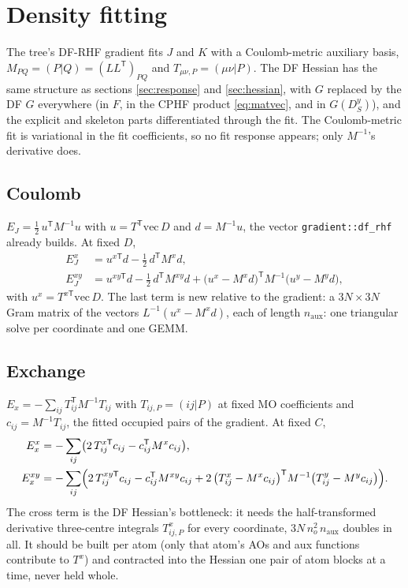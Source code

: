 \documentclass[11pt]{article}
\newcommand{\code}[1]{\texttt{#1}}
\newcommand{\Dsk}[1]{D_S^{#1}}
\begin{document}
\section{Density fitting}
\label{sec:rhf-df}

The tree's DF-RHF gradient fits $J$ and $K$ with a Coulomb-metric auxiliary
basis, $M_{PQ} = (P|Q) = (LL^{\mathsf T})_{PQ}$ and $T_{\mu\nu,P} =
(\mu\nu|P)$. The DF Hessian has the same structure as sections
\ref{sec:response} and \ref{sec:hessian}, with $G$ replaced by the DF $G$
everywhere (in $F$, in the CPHF product \eqref{eq:matvec}, and in
$G(\Dsk{y})$), and the explicit and skeleton parts differentiated through
the fit. The Coulomb-metric fit is variational in the fit coefficients, so
no fit response appears; only $M^{-1}$'s derivative does.

\subsection{Coulomb}

$E_J = \frac12\,u^{\mathsf T} M^{-1} u$ with $u = T^{\mathsf T}\mathrm{vec}\,D$
and $d = M^{-1}u$, the vector \code{gradient::df\_rhf} already builds. At
fixed $D$,
\begin{align}
  E_J^x &= u^{x\mathsf T} d - \tfrac12\,d^{\mathsf T} M^x d,\\
  E_J^{xy} &= u^{xy\mathsf T} d - \tfrac12\,d^{\mathsf T} M^{xy} d
  + \bigl(u^x - M^x d\bigr)^{\mathsf T} M^{-1} \bigl(u^y - M^y d\bigr),
  \label{eq:dfj}
\end{align}
with $u^x = T^{x\mathsf T}\mathrm{vec}\,D$. The last term is new
relative to the gradient: a $3N\times3N$ Gram matrix of the vectors
$L^{-1}(u^x - M^x d)$, each of length $n_{\mathrm{aux}}$: one triangular
solve per coordinate and one GEMM.

\subsection{Exchange}

$E_x = -\sum_{ij} T_{ij}^{\mathsf T} M^{-1} T_{ij}$ with $T_{ij,P} = (ij|P)$
at fixed MO coefficients and $c_{ij} = M^{-1}T_{ij}$, the fitted occupied
pairs of the gradient. At fixed $C$,
\begin{align}
  E_x^x &= -\sum_{ij}\bigl(2\,T^{x\mathsf T}_{ij} c_{ij}
          - c_{ij}^{\mathsf T} M^x c_{ij}\bigr),\\
  E_x^{xy} &= -\sum_{ij}\Bigl(2\,T^{xy\mathsf T}_{ij} c_{ij}
          - c_{ij}^{\mathsf T} M^{xy} c_{ij}
          + 2\,\bigl(T^x_{ij} - M^x c_{ij}\bigr)^{\mathsf T} M^{-1}
              \bigl(T^y_{ij} - M^y c_{ij}\bigr)\Bigr).
  \label{eq:dfk}
\end{align}
The cross term is the DF Hessian's bottleneck: it needs the half-transformed
derivative three-centre integrals $T^x_{ij,P}$ for every coordinate,
$3N\,n_o^2\,n_{\mathrm{aux}}$ doubles in all. It should be built per atom
(only that atom's AOs and aux functions contribute to $T^x$) and contracted
into the Hessian one pair of atom blocks at a time, never held whole.
\end{document}
